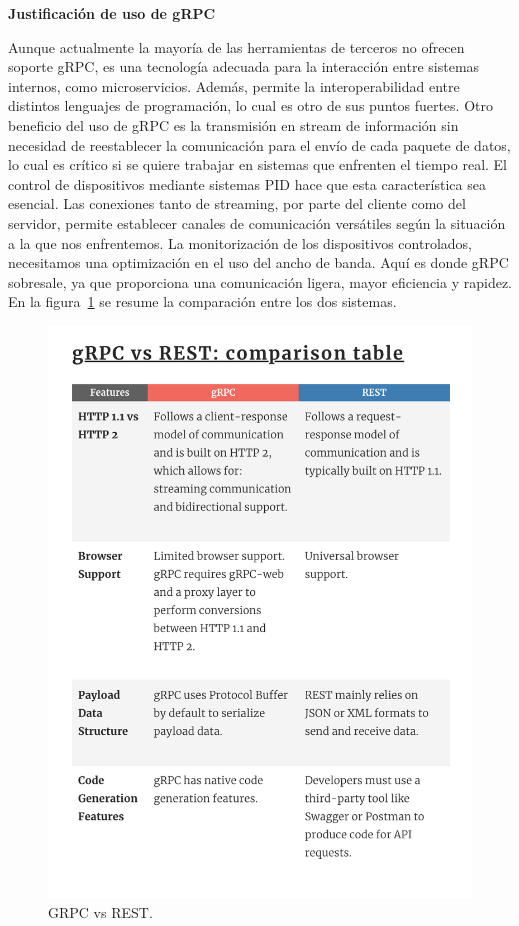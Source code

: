\textbf{Justificación de uso de gRPC}

Aunque actualmente la mayoría de las herramientas de terceros no ofrecen soporte gRPC, es una tecnología adecuada para la interacción entre sistemas internos, como microservicios.
Además, permite la interoperabilidad entre distintos lenguajes de programación, lo cual es otro de sus puntos fuertes.
Otro beneficio del uso de gRPC es la transmisión en stream de información sin necesidad de reestablecer la comunicación para el envío de cada paquete de datos, lo cual es crítico si se quiere trabajar en sistemas que enfrenten el tiempo real.
El control de dispositivos mediante sistemas PID hace que esta característica sea esencial.
Las conexiones tanto de streaming, por parte del cliente como del servidor, permite establecer canales de comunicación versátiles según la situación a la que nos enfrentemos.
La monitorización de los dispositivos controlados, necesitamos una optimización en el uso del ancho de banda.
Aquí es donde gRPC sobresale, ya que proporciona una comunicación ligera, mayor eficiencia y rapidez.
En la figura~\cref{fig:gRPC vs REST} se resume la comparación entre los dos sistemas.

\begin{figure}[H]
    \centering
    \includegraphics[height=0.4\textheight]{./part/Proyecto_ejecutivo/memoria_constructiva/rpc/img/rpcComparison}
    \caption{GRPC vs REST.\cite{berga_santos_2023}}\label{fig:gRPC vs REST}
\end{figure}